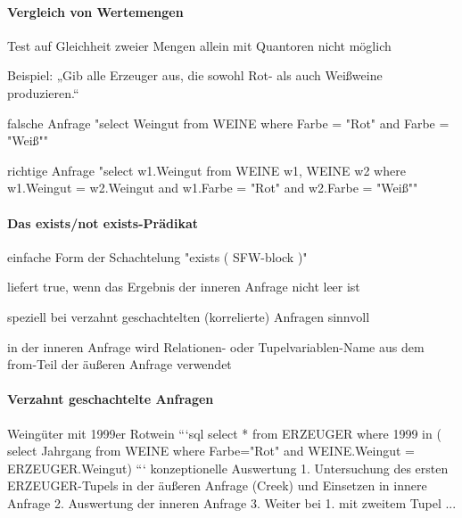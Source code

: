 \documentclass[a4paper]{article}
\begin{document}
\begin{multicols}{3}
\paragraph{Vergleich von Wertemengen}
\begin{itemize*}
    \item Test auf Gleichheit zweier Mengen allein mit Quantoren nicht möglich
    \item Beispiel: „Gib alle Erzeuger aus, die sowohl Rot- als auch Weißweine produzieren.“
    \item falsche Anfrage "select Weingut from WEINE where Farbe = "Rot" and Farbe = "Weiß""
    \item richtige Anfrage "select w1.Weingut from WEINE w1, WEINE w2 where w1.Weingut = w2.Weingut and w1.Farbe = "Rot" and w2.Farbe = "Weiß""
\end{itemize*}

\paragraph{Das exists/not exists-Prädikat}
\begin{itemize*}
    \item einfache Form der Schachtelung
    "exists ( SFW-block )"
    \item liefert true, wenn das Ergebnis der inneren Anfrage nicht leer ist
    \item speziell bei verzahnt geschachtelten (korrelierte) Anfragen sinnvoll
    \begin{itemize*}
        \item in der inneren Anfrage wird Relationen- oder Tupelvariablen-Name aus dem from-Teil der äußeren Anfrage verwendet
    \end{itemize*}
\end{itemize*}

\paragraph{Verzahnt geschachtelte Anfragen}
Weingüter mit 1999er Rotwein
```sql
select * from ERZEUGER
where 1999 in (
select Jahrgang from WEINE
where Farbe="Rot" and
WEINE.Weingut = ERZEUGER.Weingut)
```
konzeptionelle Auswertung
1. Untersuchung des ersten ERZEUGER-Tupels in der äußeren Anfrage (Creek) und Einsetzen in innere Anfrage
2. Auswertung der inneren Anfrage
3. Weiter bei 1. mit zweitem Tupel ...


\end{multicols}
\end{document}

